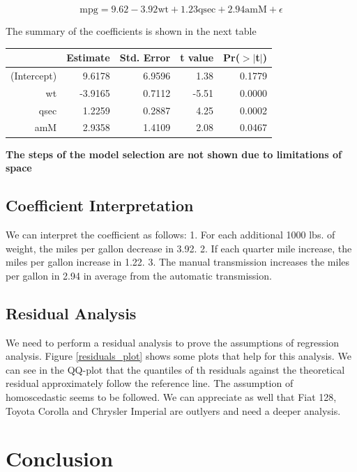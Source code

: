 \documentclass[]{article}
\begin{document}
\[\mbox{mpg} = 9.62 - 3.92\mbox{wt} + 1.23\mbox{qsec} + 2.94\mbox{amM} + \epsilon \]

The summary of the coefficients is shown in the next table

\begin{table}[ht]
\centering
\begin{tabular}{rrrrr}
  \hline
 & Estimate & Std. Error & t value & Pr($>$$|$t$|$) \\ 
  \hline
(Intercept) & 9.6178 & 6.9596 & 1.38 & 0.1779 \\ 
  wt & -3.9165 & 0.7112 & -5.51 & 0.0000 \\ 
  qsec & 1.2259 & 0.2887 & 4.25 & 0.0002 \\ 
  amM & 2.9358 & 1.4109 & 2.08 & 0.0467 \\ 
   \hline
\end{tabular}
\end{table}

\textbf{The steps of the model selection are not shown due to limitations of space}

\subsection{Coefficient Interpretation}

We can interpret the coefficient as follows: 1. For each additional 1000
lbs. of weight, the miles per gallon decrease in 3.92. 2. If each
quarter mile increase, the miles per gallon increase in 1.22. 3. The
manual transmission increases the miles per gallon in 2.94 in average
from the automatic transmission.

\subsection{Residual Analysis}

We need to perform a residual analysis to prove the assumptions of
regression analysis. Figure \ref{residuals_plot} shows some plots that
help for this analysis. We can see in the QQ-plot that the quantiles of
th residuals against the theoretical residual approximately follow the
reference line. The assumption of homoscedastic seems to be followed. We
can appreciate as well that Fiat 128, Toyota Corolla and Chrysler
Imperial are outlyers and need a deeper analysis.

\section{Conclusion}
\end{document}
